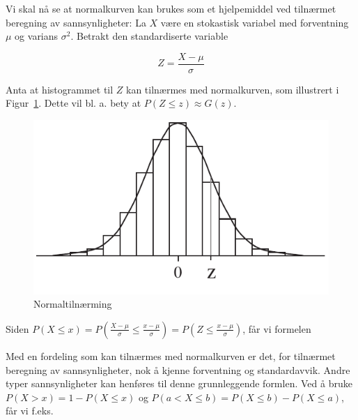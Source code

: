 \noindent Vi skal nå se at normalkurven kan brukes som et hjelpemiddel ved
tilnærmet beregning av sannsynligheter:
La $X$ være en stokastisk variabel med forventning $\mu$ og
varians ${\sigma}^2$. Betrakt den standardiserte variable

\[ Z=\frac{X-\mu}{\sigma} \]

\noindent Anta at histogrammet til $Z$ kan tilnærmes med normalkurven,
som illustrert i Figur~\ref{fig:normal_approx}. Dette vil bl. a. bety at $P(Z\leq z)\approx G(z)$.

\begin{figure}[ht]
\centering
	\includegraphics[scale=1.0]{figurer/fig6_3.pdf} 
\caption{Normaltilnærming}
	\label{fig:normal_approx}
\end{figure}

\noindent Siden $P(X \leq x)=P(\frac{X-\mu}{\sigma} \leq \frac{x-\mu}{\sigma})
    =P(Z \leq  \frac{x-\mu}{\sigma})$, får vi formelen

\begin{center}  \end{center}

\noindent Med en fordeling som kan tilnærmes med normalkurven er det,
for tilnærmet beregning av sannsynligheter, nok å kjenne
forventning og standardavvik. Andre typer sannsynligheter kan
henføres til denne grunnleggende formlen. Ved å bruke
 $P(X > x)=1-P(X \leq x)$ og $P(a < X \leq b)=P(X \leq b)-P(X \leq a)$,
 får vi f.eks.


\begin{center}  \end{center}

